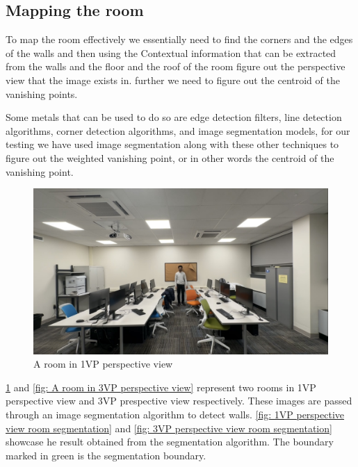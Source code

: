\subsection{Mapping the room}

To map the room effectively we essentially need to find the corners and the edges of the walls and then using the Contextual information that can be extracted from the walls and the floor and the roof of the room figure out the perspective view that the image exists in. further we need to figure out the centroid of the vanishing points.\newline

Some metals that can be used to do so are edge detection filters, line detection algorithms, corner detection algorithms, and image segmentation models, for our testing we have used image segmentation along with these other techniques to figure out the weighted vanishing point, or in other words the centroid of the vanishing point.\newline

\begin{figure}[H]
    \centering
    \includegraphics[width=1.0\textwidth]{1vp room.jpg}
    \caption{A room in 1VP perspective view}
    \label{fig: A room in 1VP perspective view}
\end{figure}


\ref{fig: A room in 1VP perspective view} and \ref{fig: A room in 3VP perspective view} represent two rooms in 1VP perspective view and 3VP prespective view respectively. These images are passed through an image segmentation algorithm to detect walls. \ref{fig: 1VP perspective view room segmentation} and \ref{fig: 3VP perspective view room segmentation}  showcase he result obtained from the segmentation algorithm. The boundary marked in green is the segmentation boundary.\newline

